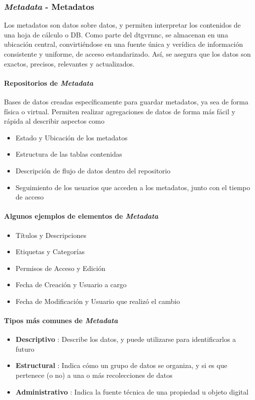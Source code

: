 \subsubsection{\textit{Metadata} - Metadatos}
Los metadatos son datos sobre datos, y permiten interpretar los contenidos de una hoja de cálculo o DB. Como parte del \gls{dtgvrnnc}, se almacenan en una ubicación central, convirtiéndose en una fuente única y verídica de información consistente y uniforme, de acceso estandarizado. Así, se asegura que los datos son exactos, precisos, relevantes y actualizados. 

\paragraph{Repositorios de \textit{Metadata}}
Bases de datos creadas específicamente para guardar metadatos, ya sea de forma física o virtual. Permiten realizar agregaciones de datos de forma más fácil y rápida al describir aspectos como
\begin{itemize}
    \item {Estado y Ubicación de los metadatos}
    \item {Estructura de las tablas contenidas}
    \item {Descripción de flujo de datos dentro del repositorio}
    \item {Seguimiento de los usuarios que acceden a los metadatos, junto con el tiempo de acceso}
\end{itemize}


\paragraph{Algunos ejemplos de elementos de \textit{Metadata}}
\begin{itemize}
    \item {Títulos y Descripciones}
    \item {Etiquetas y Categorías}
    \item {Permisos de Acceso y Edición}
    \item {Fecha de Creación y Usuario a cargo}
    \item {Fecha de Modificación y Usuario que realizó el cambio}
\end{itemize}

\paragraph{Tipos más comunes de \textit{Metadata}}
\begin{itemize}
        \item {\textbf{Descriptivo} : Describe los datos, y puede utilizarse para identificarlos a futuro}
        \item {\textbf{Estructural} : Indica cómo un grupo de datos se organiza, y si es que pertenece (o no) a una o más recolecciones de datos}
        \item {\textbf{Administrativo} : Indica la fuente técnica de una propiedad u objeto digital}
\end{itemize}

